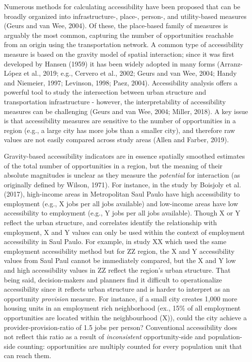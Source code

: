 \documentclass[]{elsarticle} %
\begin{document}
Numerous methods for calculating accessibility have been proposed that
can be broadly organized into infrastructure-, place-, person-, and
utility-based measures (Geurs and van Wee, 2004). Of these, the
place-based family of measures is arguably the most common, capturing
the number of opportunities reachable from an origin using the
transportation network. A common type of accessibility measure is based
on the gravity model of spatial interaction; since it was first
developed by Hansen (1959) it has been widely adopted in many forms
(Arranz-López et al., 2019; e.g., Cervero et al., 2002; Geurs and van
Wee, 2004; Handy and Niemeier, 1997; Levinson, 1998; Paez, 2004).
Accessibility analysis offers a powerful tool to study the intersection
between urban structure and transportation infrastructure - however, the
interpretability of accessibility measures can be challenging (Geurs and
van Wee, 2004; Miller, 2018). A key issue is that accessibility measures
are sensitive to the number of opportunities in a region (e.g., a large
city has more jobs than a smaller city), and therefore raw values are
not easily compared across study areas (Allen and Farber, 2019).

Gravity-based accessibility indicators are in essence spatially smoothed
estimates of the total number of opportunities in a region, but the
meaning of their absolute magnitudes is unclear as they measure the
\emph{potential} for interaction (as originally defined by Wilson,
1971). For instance, in the study by Boisjoly et al. (2017), high-income
areas in Metropolitan Saul Paulo have high accessibility to employment
(e.g., X jobs per all jobs available) and low-income areas have low
accessibility to employment (e.g., Y jobs per all jobs available).
Though X or Y reflect the urban structure, and correlates identify the
relationship with employment, X and Y values can only be used within the
context of employment accessibility in Saul Paulo. For example, in study
XX which used the same employment accessibility method but for ZZ
region, the X and Y accessibility values from Saul Paul cannot be
immediately compared, but the X and Y low and high accessibility values
in ZZ reflect the region's urban structure. That being said,
decision-makers and planners find it difficult to operationalize
accessibility since it reflects urban structure and is harder to
interpret as an opportunity \emph{provision} measure. For instance, if a
small city creates 1,000 more housing units in an employment rich
neighborhood (ex., 15\% of all employment opportunities are located
within the neighbourhood (X)), could the city achieve a
provider-provision-ratio of 1.5 jobs per person? Conventional
accessibility does not reflect this ratio as a result of
\emph{inconsistent} opportunity-side and population-side counting:
opportunities are multiply counted for every population unit that can
reach them.
\end{document}
